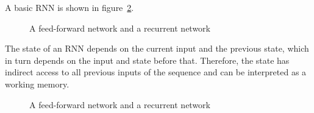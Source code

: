 \documentclass[vecarrow]{svproc}
\begin{document}
A basic RNN is shown in
figure~\ref{fig:1}. 

\begin{figure}
\caption{A feed-forward network and a recurrent network}
\label{fig:1}
\end{figure}

The state of an RNN depends on the current input and the previous state, which in turn
depends on the input and state before that. Therefore, the state has indirect access to all previous inputs of the sequence and can be interpreted as a working memory.

\begin{figure}
\caption{A feed-forward network and a recurrent network}
\label{fig:1}
\end{figure}




\end{document}
